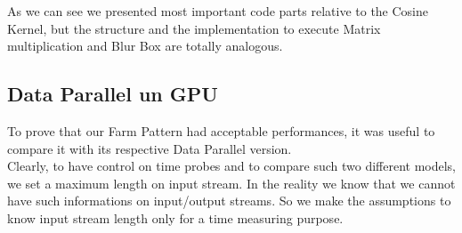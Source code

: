 	As we can see we presented most important code parts relative to the Cosine Kernel, but the structure and the implementation to execute Matrix multiplication and Blur Box are totally analogous.

\subsection{Data Parallel un GPU}
	To prove that our Farm Pattern had acceptable performances, it was useful to compare it with its respective Data Parallel version.\\
	Clearly, to have control on time probes and to compare such two different models, we set a maximum length on input stream. In the reality we know that we cannot have such informations on input/output streams. So we make the assumptions to know input stream length only for a time measuring purpose.
	
